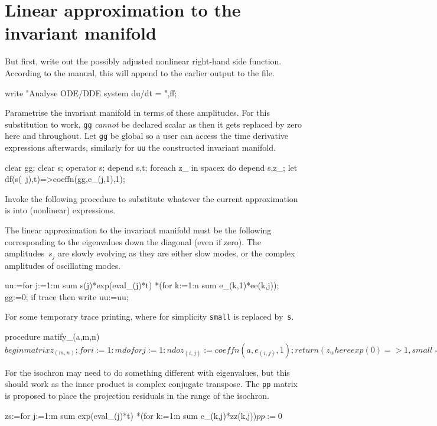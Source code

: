 \documentclass[11pt,a5paper]{article}
\begin{document}
\section{Linear approximation to the invariant manifold}

But first, write out the possibly adjusted nonlinear
right-hand side function. According to the manual, this will
append to the earlier output to the file.
\begin{reduce}
write "Analyse ODE/DDE system du/dt = ",ff;
\end{reduce}

Parametrise the invariant manifold in terms of these
amplitudes. For this substitution to work, \verb|gg|
\emph{cannot} be declared scalar as then it gets replaced by
zero here and throughout.  Let \verb|gg| be global so a user
can access the time derivative expressions afterwards,
similarly for \verb|uu| the constructed invariant manifold.
\begin{reduce}
clear gg;
clear s; operator s; depend s,t;
foreach z_ in spacex do depend s,z_;
let df(s(~j),t)=>coeffn(gg,e_(j,1),1);
\end{reduce}


Invoke the following procedure to substitute whatever the
current approximation is into (nonlinear) expressions.


The linear approximation to the invariant manifold must be
the following corresponding to the eigenvalues down the
diagonal (even if zero).  The amplitudes~$s_j$ are slowly
evolving as they are either slow modes, or the complex
amplitudes of oscillating modes.
\begin{reduce}
uu:=for j:=1:m sum s(j)*exp(eval_(j)*t)
  *(for k:=1:n sum e_(k,1)*ee(k,j));
gg:=0;
if trace then write uu:=uu;
\end{reduce}

For some temporary trace printing, where for simplicity
\verb|small| is replaced by~\verb|s|.
\begin{reduce}
procedure matify_(a,m,n)$
  begin matrix z_(m,n);
    for i:=1:m do for j:=1:n do z_(i,j):=coeffn(a,e_(i,j),1);
    return (z_ where {exp(0)=>1,small=>s}); 
    end$
\end{reduce}

For the isochron may need to do something different with
eigenvalues, but this should work as the inner product is
complex conjugate transpose. The \verb|pp| matrix is
proposed to place the projection residuals in the range of
the isochron. 
\begin{reduce}
zs:=for j:=1:m sum exp(eval_(j)*t)
  *(for k:=1:n sum e_(k,j)*zz(k,j))$
pp:=0$
\end{reduce}
\end{document}
